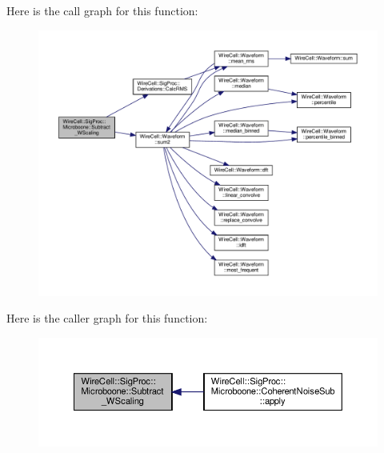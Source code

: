 Here is the call graph for this function\+:
\nopagebreak
\begin{figure}[H]
\begin{center}
\leavevmode
\includegraphics[width=350pt]{namespace_wire_cell_1_1_sig_proc_1_1_microboone_a06023d4f9428b8e2f9ce469d3bacb7b4_cgraph}
\end{center}
\end{figure}
Here is the caller graph for this function\+:
\nopagebreak
\begin{figure}[H]
\begin{center}
\leavevmode
\includegraphics[width=350pt]{namespace_wire_cell_1_1_sig_proc_1_1_microboone_a06023d4f9428b8e2f9ce469d3bacb7b4_icgraph}
\end{center}
\end{figure}
